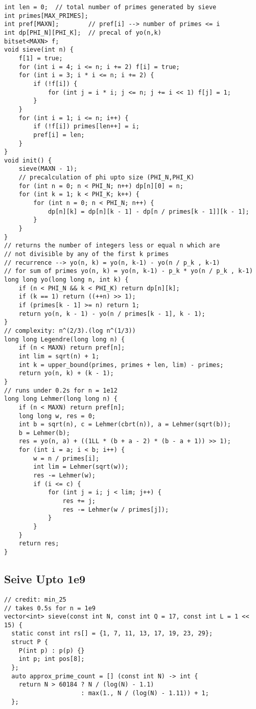 \documentclass[10pt,a4paper,onesided]{article}
\begin{document}
\begin{multicols*}{3}
\begin{lstlisting}
int len = 0;  // total number of primes generated by sieve
int primes[MAX_PRIMES];
int pref[MAXN];        // pref[i] --> number of primes <= i
int dp[PHI_N][PHI_K];  // precal of yo(n,k)
bitset<MAXN> f;
void sieve(int n) {
    f[1] = true;
    for (int i = 4; i <= n; i += 2) f[i] = true;
    for (int i = 3; i * i <= n; i += 2) {
        if (!f[i]) {
            for (int j = i * i; j <= n; j += i << 1) f[j] = 1;
        }
    }
    for (int i = 1; i <= n; i++) {
        if (!f[i]) primes[len++] = i;
        pref[i] = len;
    }
}
void init() {
    sieve(MAXN - 1);
    // precalculation of phi upto size (PHI_N,PHI_K)
    for (int n = 0; n < PHI_N; n++) dp[n][0] = n;
    for (int k = 1; k < PHI_K; k++) {
        for (int n = 0; n < PHI_N; n++) {
            dp[n][k] = dp[n][k - 1] - dp[n / primes[k - 1]][k - 1];
        }
    }
}
// returns the number of integers less or equal n which are
// not divisible by any of the first k primes
// recurrence --> yo(n, k) = yo(n, k-1) - yo(n / p_k , k-1)
// for sum of primes yo(n, k) = yo(n, k-1) - p_k * yo(n / p_k , k-1)
long long yo(long long n, int k) {
    if (n < PHI_N && k < PHI_K) return dp[n][k];
    if (k == 1) return ((++n) >> 1);
    if (primes[k - 1] >= n) return 1;
    return yo(n, k - 1) - yo(n / primes[k - 1], k - 1);
}
// complexity: n^(2/3).(log n^(1/3))
long long Legendre(long long n) {
    if (n < MAXN) return pref[n];
    int lim = sqrt(n) + 1;
    int k = upper_bound(primes, primes + len, lim) - primes;
    return yo(n, k) + (k - 1);
}
// runs under 0.2s for n = 1e12
long long Lehmer(long long n) {
    if (n < MAXN) return pref[n];
    long long w, res = 0;
    int b = sqrt(n), c = Lehmer(cbrt(n)), a = Lehmer(sqrt(b));
    b = Lehmer(b);
    res = yo(n, a) + ((1LL * (b + a - 2) * (b - a + 1)) >> 1);
    for (int i = a; i < b; i++) {
        w = n / primes[i];
        int lim = Lehmer(sqrt(w));
        res -= Lehmer(w);
        if (i <= c) {
            for (int j = i; j < lim; j++) {
                res += j;
                res -= Lehmer(w / primes[j]);
            }
        }
    }
    return res;
}
\end{lstlisting}
\subsection{Seive Upto 1e9}
\begin{lstlisting}
// credit: min_25
// takes 0.5s for n = 1e9
vector<int> sieve(const int N, const int Q = 17, const int L = 1 << 15) {
  static const int rs[] = {1, 7, 11, 13, 17, 19, 23, 29};
  struct P { 
    P(int p) : p(p) {}
    int p; int pos[8];
  };
  auto approx_prime_count = [] (const int N) -> int {
    return N > 60184 ? N / (log(N) - 1.1)
                     : max(1., N / (log(N) - 1.11)) + 1;
  };


\end{lstlisting}
\end{multicols*}
\end{document}
